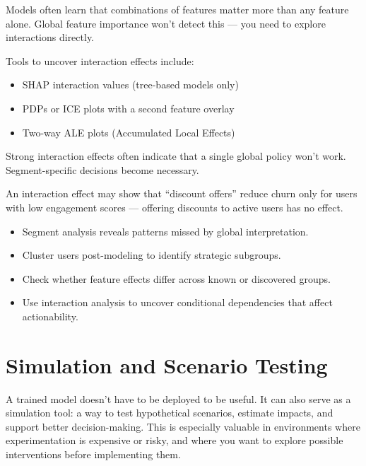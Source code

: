 \documentclass[12pt,openany]{book}
\begin{document}
Models often learn that combinations of features matter more than any feature alone. Global feature importance won’t detect this — you need to explore interactions directly.

Tools to uncover interaction effects include:
\begin{itemize}
  \item SHAP interaction values (tree-based models only)
  \item PDPs or ICE plots with a second feature overlay
  \item Two-way ALE plots (Accumulated Local Effects)
\end{itemize}

\begin{notebox}
Strong interaction effects often indicate that a single global policy won't work. Segment-specific decisions become necessary.
\end{notebox}

\begin{examplebox}
An interaction effect may show that ``discount offers'' reduce churn only for users with low engagement scores — offering discounts to active users has no effect.
\end{examplebox}

\begin{summarybox}
\begin{itemize}
  \item Segment analysis reveals patterns missed by global interpretation.
  \item Cluster users post-modeling to identify strategic subgroups.
  \item Check whether feature effects differ across known or discovered groups.
  \item Use interaction analysis to uncover conditional dependencies that affect actionability.
\end{itemize}
\end{summarybox}




\chapter{Simulation and Scenario Testing}

A trained model doesn’t have to be deployed to be useful. It can also serve as a simulation tool: a way to test hypothetical scenarios, estimate impacts, and support better decision-making. This is especially valuable in environments where experimentation is expensive or risky, and where you want to explore possible interventions before implementing them.
\end{document}
